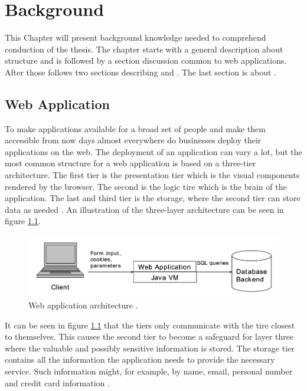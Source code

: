 \chapter{Background}
This Chapter will present background knowledge needed to comprehend conduction of the thesis. The chapter starts with a general description about \textit{} structure and is followed by a section discussion common \textit{} to web applications. After those follows two sections describing \textit{} and \textit{}. The last section is about \textit{}.



\section{Web Application}
\label{WebApplication}
To make applications available for a broad set of people and make them accessible from now days almost everywhere do businesses deploy their applications on the web. The deployment of an application can vary a lot, but the most common structure for a web application is based on a three-tier architecture. The first tier is the presentation tier which is the visual components rendered by the browser. The second is the logic tire which is the brain of the application. The last and third tier is the storage, where the second tier can store data as needed \parencite{JustinClarke-Salt2009SIAa}. An illustration of the three-layer architecture can be seen in figure \ref{fig:webApplication-Haldar}.

\begin{figure}
    \centering
    \includegraphics[width=\textwidth]{images/webApplication-Haldar.png}
    \caption{Web application architecture \cite{Haldar}.}
    \label{fig:webApplication-Haldar}
\end{figure}

It can be seen in figure \ref{fig:webApplication-Haldar} that the tiers only communicate with the tire closest to themselves. This causes the second tier to become a safeguard for layer three where the valuable and possibly sensitive information is stored. The storage tier contains all the information the application needs to provide the necessary service. Such information might, for example, by name, email, personal number and credit card information \parencite{JustinClarke-Salt2009SIAa}.

